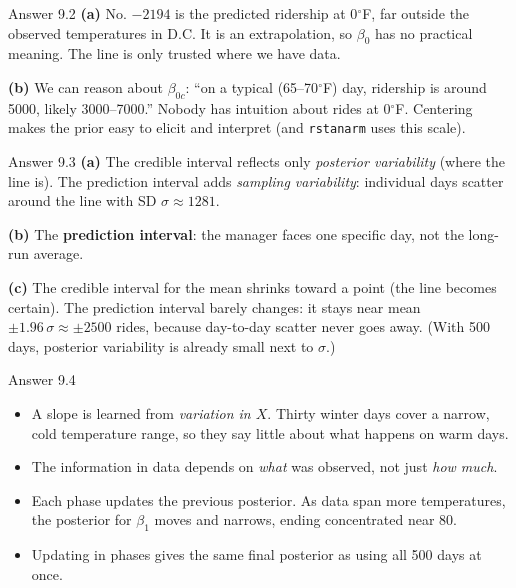 \documentclass[aspectratio=43,11pt]{beamer}
\begin{document}
\begin{frame}{Answer 9.2}
  \textbf{(a)} No. $-2194$ is the predicted ridership at 0$^\circ$F, far
  outside the observed temperatures in D.C. It is an extrapolation, so
  $\beta_0$ has no practical meaning. The line is only trusted where we
  have data.
  \vspace{0.4em}

  \textbf{(b)} We can reason about $\beta_{0c}$: ``on a typical
  (65--70$^\circ$F) day, ridership is around 5000, likely 3000--7000.''
  Nobody has intuition about rides at 0$^\circ$F. Centering makes the
  prior easy to elicit and interpret (and \texttt{rstanarm} uses this
  scale).
\end{frame}

\begin{frame}{Answer 9.3}
  \textbf{(a)} The credible interval reflects only \emph{posterior
  variability} (where the line is). The prediction interval adds
  \emph{sampling variability}: individual days scatter around the line
  with SD $\sigma \approx 1281$.
  \vspace{0.4em}

  \textbf{(b)} The \textbf{prediction interval}: the manager faces one
  specific day, not the long-run average.
  \vspace{0.4em}

  \textbf{(c)} The credible interval for the mean shrinks toward a point
  (the line becomes certain). The prediction interval barely changes: it
  stays near mean $\pm 1.96\,\sigma \approx \pm 2500$ rides, because
  day-to-day scatter never goes away. (With 500 days, posterior
  variability is already small next to $\sigma$.)
\end{frame}

\begin{frame}{Answer 9.4}
  \begin{itemize}
    \item A slope is learned from \emph{variation in $X$}. Thirty winter
      days cover a narrow, cold temperature range, so they say little
      about what happens on warm days.
    \item The information in data depends on \emph{what} was observed,
      not just \emph{how much}.
    \item Each phase updates the previous posterior. As data span more
      temperatures, the posterior for $\beta_1$ moves and narrows,
      ending concentrated near 80.
    \item Updating in phases gives the same final posterior as using all
      500 days at once.
  \end{itemize}
\end{frame}
\end{document}
